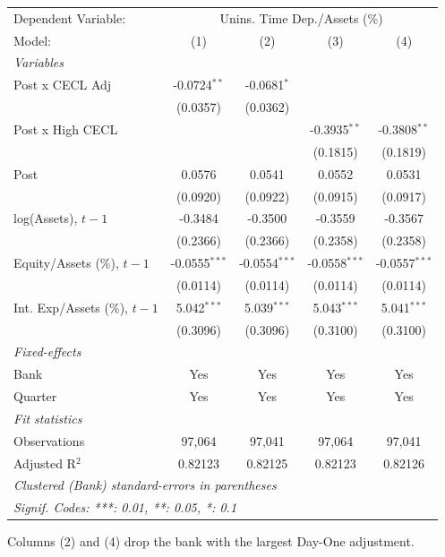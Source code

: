 
\begingroup
\centering
\begin{tabular}{lcccc}
   \tabularnewline \midrule \midrule
   Dependent Variable: & \multicolumn{4}{c}{Unins. Time Dep./Assets (\%)}\\
   Model:                         & (1)             & (2)             & (3)             & (4)\\  
   \midrule
   \emph{Variables}\\
   Post x CECL Adj                & -0.0724$^{**}$  & -0.0681$^{*}$   &                 &   \\   
                                  & (0.0357)        & (0.0362)        &                 &   \\   
   Post x High CECL               &                 &                 & -0.3935$^{**}$  & -0.3808$^{**}$\\   
                                  &                 &                 & (0.1815)        & (0.1819)\\   
   Post                           & 0.0576          & 0.0541          & 0.0552          & 0.0531\\   
                                  & (0.0920)        & (0.0922)        & (0.0915)        & (0.0917)\\   
   log(Assets), $t{-}1$           & -0.3484         & -0.3500         & -0.3559         & -0.3567\\   
                                  & (0.2366)        & (0.2366)        & (0.2358)        & (0.2358)\\   
   Equity/Assets (\%), $t{-}1$    & -0.0555$^{***}$ & -0.0554$^{***}$ & -0.0558$^{***}$ & -0.0557$^{***}$\\   
                                  & (0.0114)        & (0.0114)        & (0.0114)        & (0.0114)\\   
   Int. Exp/Assets (\%), $t{-}1$  & 5.042$^{***}$   & 5.039$^{***}$   & 5.043$^{***}$   & 5.041$^{***}$\\   
                                  & (0.3096)        & (0.3096)        & (0.3100)        & (0.3100)\\   
   \midrule
   \emph{Fixed-effects}\\
   Bank                           & Yes             & Yes             & Yes             & Yes\\  
   Quarter                        & Yes             & Yes             & Yes             & Yes\\  
   \midrule
   \emph{Fit statistics}\\
   Observations                   & 97,064          & 97,041          & 97,064          & 97,041\\  
   Adjusted R$^2$                 & 0.82123         & 0.82125         & 0.82123         & 0.82126\\  
   \midrule \midrule
   \multicolumn{5}{l}{\emph{Clustered (Bank) standard-errors in parentheses}}\\
   \multicolumn{5}{l}{\emph{Signif. Codes: ***: 0.01, **: 0.05, *: 0.1}}\\
\end{tabular}
 
\par \raggedright 
Columns (2) and (4) drop the bank with the largest Day-One adjustment.
\par\endgroup



